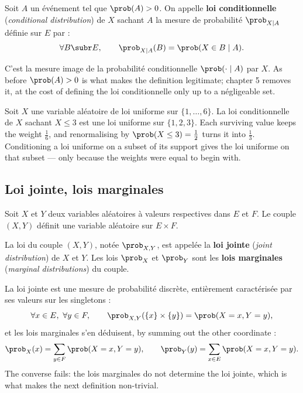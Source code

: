 \begin{definition}
  Soit $A$ un événement tel que $\prob(A) > 0$. On appelle \textbf{loi
  conditionnelle} (\textit{conditional distribution}) de $X$ sachant $A$ la
  mesure de probabilité $\prob_{X \mid A}$ définie sur $E$ par :
  \[ \forall B \subr E, \qquad \prob_{X \mid A}(B) = \prob(X \in B \mid A). \]
\end{definition}

C'est la mesure image de la probabilité conditionnelle $\prob(\cdot \mid A)$ par
$X$. As before $\prob(A) > 0$ is what makes the definition legitimate; chapter 5
removes it, at the cost of defining the loi conditionnelle only up to a
négligeable set.

\begin{example}
  Soit $X$ une variable aléatoire de loi uniforme sur $\{1,\dots,6\}$. La loi
  conditionnelle de $X$ sachant $X \le 3$ est une loi uniforme sur $\{1,2,3\}$.
  Each surviving value keeps the weight $\tfrac16$, and renormalising by
  $\prob(X \le 3) = \tfrac12$ turns it into $\tfrac13$. Conditioning a loi
  uniforme on a subset of its support gives the loi uniforme on that subset ---
  only because the weights were equal to begin with.
\end{example}

\subsection{Loi jointe, lois marginales}

Soit $X$ et $Y$ deux variables aléatoires à valeurs respectives dans $E$ et $F$.
Le couple $(X,Y)$ définit une variable aléatoire sur $E \times F$.

\begin{definition}
  La loi du couple $(X,Y)$, notée $\prob_{X,Y}$, est appelée la \textbf{loi
  jointe} (\textit{joint distribution}) de $X$ et $Y$. Les lois $\prob_{X}$ et
  $\prob_{Y}$ sont les \textbf{lois marginales} (\textit{marginal distributions})
  du couple.
\end{definition}

La loi jointe est une mesure de probabilité discrète, entièrement caractérisée
par ses valeurs sur les singletons :
\[ \forall x \in E,\ \forall y \in F, \qquad
   \prob_{X,Y}(\{x\} \times \{y\}) = \prob(X = x, Y = y), \]
et les lois marginales s'en déduisent, by summing out the other coordinate :
\[ \prob_{X}(x) = \sum_{y \in F} \prob(X = x, Y = y), \qquad
   \prob_{Y}(y) = \sum_{x \in E} \prob(X = x, Y = y). \]
The converse fails: the lois marginales do not determine the loi jointe, which
is what makes the next definition non-trivial.

